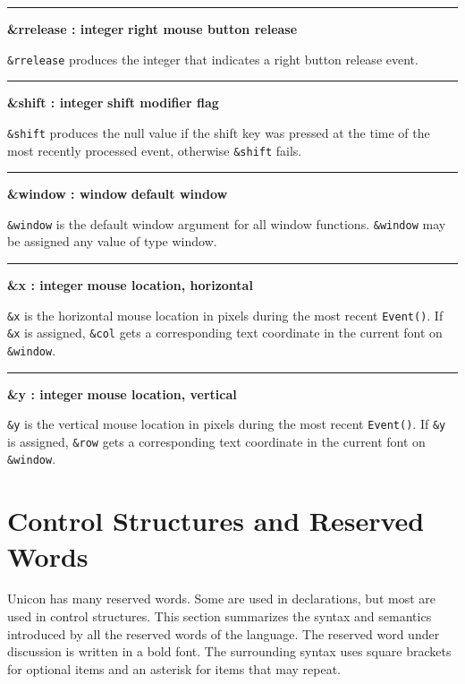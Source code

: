 \bigskip\hrule\vspace{0.1cm}
\noindent
{\bf \&rrelease : integer } \hfill {\bf right mouse button release}

\noindent
\texttt{\&rrelease} produces the integer that indicates a right button
release event.

\bigskip\hrule\vspace{0.1cm}
\noindent
{\bf \&shift : integer } \hfill {\bf shift modifier flag}

\noindent
\texttt{\&shift} produces the null value if the shift key was pressed at
the time of the most recently processed event, otherwise
\texttt{\&shift} fails.

\bigskip\hrule\vspace{0.1cm}
\noindent
{\bf \&window : window } \hfill {\bf default window}

\noindent
\texttt{\&window} is the default window argument for all window
functions. \texttt{\&window} may be assigned any value of type
window.

\bigskip\hrule\vspace{0.1cm}
\noindent
{\bf \&x : integer } \hfill {\bf mouse location, horizontal}

\noindent
\texttt{\&x} is the horizontal mouse location in pixels during the most
recent \texttt{Event()}. If \texttt{\&x} is assigned, \texttt{\&col}
gets a corresponding text coordinate in the current font on
\texttt{\&window}.

\bigskip\hrule\vspace{0.1cm}
\noindent
{\bf \&y : integer } \hfill {\bf mouse location, vertical}

\noindent
\texttt{\&y} is the vertical mouse location in pixels during the most
recent \texttt{Event()}. If \texttt{\&y} is assigned, \texttt{\&row}
gets a corresponding text coordinate in the current font on
\texttt{\&window}.

\section{Control Structures and Reserved Words}

Unicon has many reserved words. Some are used in
declarations, but most are used in control
structures. This section summarizes the syntax and semantics
introduced by all the reserved words of the language. The reserved
word under discussion is written in a bold font. The surrounding
syntax uses square brackets for optional items and an asterisk for
items that may repeat.

